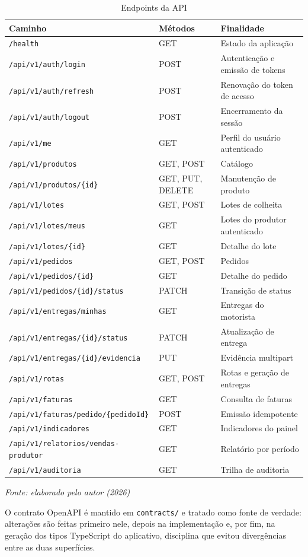 \begin{table}[H]
  \centering
  \caption{Endpoints da API}
  \label{tab:endpoints}
  \fontsize{9}{11}\selectfont
  \begin{tabular}{L{6.8cm}L{2.2cm}L{6.0cm}}
    \toprule
    \textbf{Caminho} & \textbf{Métodos} & \textbf{Finalidade} \\
    \midrule
    \texttt{/health} & GET & Estado da aplicação \\
    \texttt{/api/v1/auth/login} & POST & Autenticação e emissão de tokens \\
    \texttt{/api/v1/auth/refresh} & POST & Renovação do token de acesso \\
    \texttt{/api/v1/auth/logout} & POST & Encerramento da sessão \\
    \texttt{/api/v1/me} & GET & Perfil do usuário autenticado \\
    \texttt{/api/v1/produtos} & GET, POST & Catálogo \\
    \texttt{/api/v1/produtos/\{id\}} & GET, PUT, DELETE & Manutenção de produto \\
    \texttt{/api/v1/lotes} & GET, POST & Lotes de colheita \\
    \texttt{/api/v1/lotes/meus} & GET & Lotes do produtor autenticado \\
    \texttt{/api/v1/lotes/\{id\}} & GET & Detalhe do lote \\
    \texttt{/api/v1/pedidos} & GET, POST & Pedidos \\
    \texttt{/api/v1/pedidos/\{id\}} & GET & Detalhe do pedido \\
    \texttt{/api/v1/pedidos/\{id\}/status} & PATCH & Transição de status \\
    \texttt{/api/v1/entregas/minhas} & GET & Entregas do motorista \\
    \texttt{/api/v1/entregas/\{id\}/status} & PATCH & Atualização de entrega \\
    \texttt{/api/v1/entregas/\{id\}/evidencia} & PUT & Evidência multipart \\
    \texttt{/api/v1/rotas} & GET, POST & Rotas e geração de entregas \\
    \texttt{/api/v1/faturas} & GET & Consulta de faturas \\
    \texttt{/api/v1/faturas/pedido/\{pedidoId\}} & POST & Emissão idempotente \\
    \texttt{/api/v1/indicadores} & GET & Indicadores do painel \\
    \texttt{/api/v1/relatorios/vendas-produtor} & GET & Relatório por período \\
    \texttt{/api/v1/auditoria} & GET & Trilha de auditoria \\
    \bottomrule
  \end{tabular}

  \vspace{2pt}
  {\fontsize{9}{11}\selectfont\itshape Fonte: elaborado pelo autor (2026)}
\end{table}

O contrato OpenAPI é mantido em \texttt{contracts/} e tratado como fonte de
verdade: alterações são feitas primeiro nele, depois na implementação e, por fim,
na geração dos tipos TypeScript do aplicativo, disciplina que evitou divergências
entre as duas superfícies.
